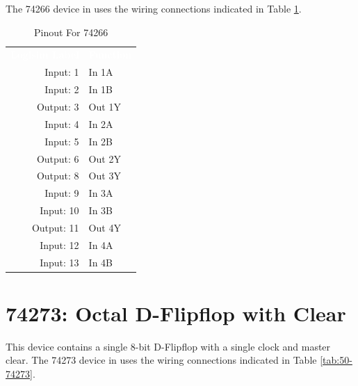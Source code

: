 The 74266 device in \LE uses the wiring connections indicated in Table \ref{tab:50-74266}.

\begin{table}[H]
	\sffamily
	\newcommand{\head}[1]{\textcolor{white}{\textbf{#1}}}		
	\begin{center}
		\begin{tabular}{rl} 
			\rowcolor{black!75}
			\head{Logisim Label} & \head{Function} \\
			Input: 1   & In 1A  \\
			Input: 2   & In 1B  \\
			Output: 3  & Out 1Y \\
			Input: 4   & In 2A  \\
			Input: 5   & In 2B  \\
			Output: 6  & Out 2Y \\
			Output: 8  & Out 3Y \\
			Input: 9   & In 3A  \\
			Input: 10  & In 3B  \\
			Output: 11 & Out 4Y \\
			Input: 12  & In 4A  \\
			Input: 13  & In 4B  \\
		\end{tabular}
	\end{center}
	\caption{Pinout For 74266}
	\label{tab:50-74266}
\end{table}

\section{74273: Octal D-Flipflop with Clear}

This device contains a single 8-bit D-Flipflop with a single clock and master clear. The 74273 device in \LE uses the wiring connections indicated in Table \ref{tab:50-74273}.

